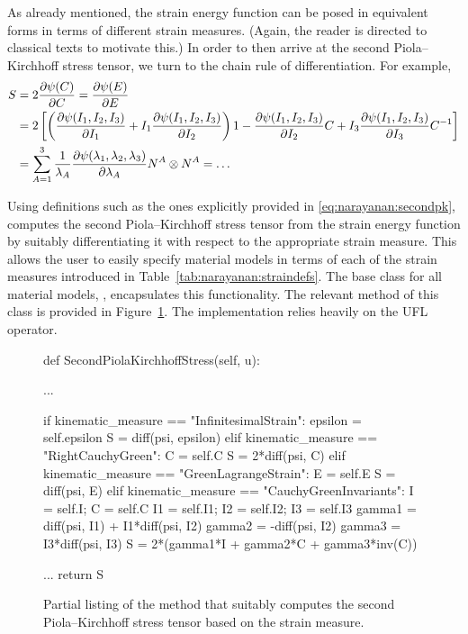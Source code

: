 As already mentioned, the strain energy function can be posed in
equivalent forms in terms of different strain measures. (Again, the
reader is directed to classical texts to motivate this.) In order to
then arrive at the second Piola--Kirchhoff stress tensor, we turn to
the chain rule of differentiation. For example,
\begin{equation}
\begin{split}
  \mbox{$ S$} & = 2 \frac{\partial \psi(\mbox{$ C$})}{\partial \mbox{$ C$}} = \frac{\partial
    \psi(\mbox{$ E$})}{\partial \mbox{$ E$}}\\
      & = 2\left[\left(\frac{\partial \psi (I_{1}, I_{2},
            I_{3})}{\partial I_{1}} + I_{1} \frac{\partial \psi (I_{1}, I_{2},
            I_{3})}{\partial I_{2}} \right) {1} - \frac{\partial \psi (I_{1},
          I_{2}, I_{3})}{\partial I_{2}} \mbox{$ C$} + I_{3} \frac{\partial \psi (I_{1},
          I_{2}, I_{3})}{\partial I_{3}} \mbox{$ C$}^{-1} \right]\\
      & = \sum_{A = 1}^{3}
      \frac{1}{\lambda_{A}} \frac{\partial \psi(\lambda_{1},
        \lambda_{2}, \lambda_{3})}{\partial
        \lambda_{A}} \mbox{$ N$}^{A}\otimes\mbox{$ N$}^{A} = \ldots
\end{split}
\label{eq:narayanan:secondpk}
\end{equation}

Using definitions such as the ones explicitly provided in
\eqref{eq:narayanan:secondpk}, \twist{} computes the second
Piola--Kirchhoff stress tensor from the strain energy function by
suitably differentiating it with respect to the appropriate strain
measure. This allows the user to easily specify material models in
terms of each of the strain measures introduced in
Table~\ref{tab:narayanan:straindefs}. The base class for all material
models, , encapsulates this functionality. The
relevant method of this class is provided in
Figure~\ref{code:narayanan:material_model_base.py}. The implementation
relies heavily on the UFL  operator.

\begin{figure}
\begin{python}
def SecondPiolaKirchhoffStress(self, u):

  ...

  if kinematic_measure == "InfinitesimalStrain":
    epsilon = self.epsilon
    S = diff(psi, epsilon)
  elif kinematic_measure == "RightCauchyGreen":
    C = self.C
    S = 2*diff(psi, C)
  elif kinematic_measure == "GreenLagrangeStrain":
    E = self.E
    S = diff(psi, E)
  elif kinematic_measure == "CauchyGreenInvariants":
    I = self.I; C = self.C
    I1 = self.I1; I2 = self.I2; I3 = self.I3
    gamma1 = diff(psi, I1) + I1*diff(psi, I2)
    gamma2 = -diff(psi, I2)
    gamma3 = I3*diff(psi, I3)
    S = 2*(gamma1*I + gamma2*C + gamma3*inv(C))

  ...
  return S
\end{python}
\label{code:narayanan:material_model_base.py}
\caption{Partial listing of the method that suitably computes the
  second Piola--Kirchhoff stress tensor based on the strain measure.}
\end{figure}

